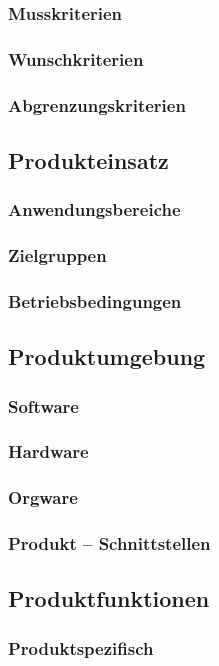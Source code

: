 \documentclass[12pt,a4paper]{scrreprt}
\begin{document}
\subsubsection{Musskriterien}
\subsubsection{Wunschkriterien}
\subsubsection{Abgrenzungskriterien}
\subsection{Produkteinsatz}
\subsubsection{Anwendungsbereiche}
\subsubsection{Zielgruppen}
\subsubsection{Betriebsbedingungen}
\subsection{Produktumgebung}
\subsubsection{Software}
\subsubsection{Hardware}
\subsubsection{Orgware}
\subsubsection{Produkt – Schnittstellen}
\subsection{Produktfunktionen}
\subsubsection{Produktspezifisch}
\end{document}
